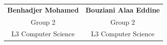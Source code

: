 \documentclass[12pt,a4paper]{report}
\begin{document}
\begin{titlepage}
\vspace{2cm}

\begin{center}
  \renewcommand{\arraystretch}{1.5}
  \begin{tabular}{cc}
    {\large\bfseries Benhadjer Mohamed} & {\large\bfseries Bouziani Alaa Eddine} \\
    {\small\color{slategray} Group 2} & {\small\color{slategray} Group 2} \\
    {\small\color{slategray} L3 Computer Science} & {\small\color{slategray} L3 Computer Science}
  \end{tabular}
\end{center}

\vfill
\restoregeometry
\end{titlepage}



\tableofcontents
\newpage


\end{document}
